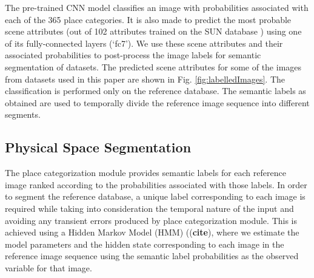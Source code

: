 \documentclass[letterpaper, 10 pt, conference]{ieeeconf}  %
\begin{document}
The pre-trained CNN model classifies an image with probabilities associated with each of the 365 place categories. It is also made to predict the most probable scene attributes (out of 102 attributes trained on the SUN database \cite{Patterson2012SunAttributes}) using one of its fully-connected layers (`fc7'). We use these scene attributes and their associated probabilities to post-process the image labels for semantic segmentation of datasets. The predicted scene attributes for some of the images from datasets used in this paper are shown in Fig. \ref{fig:labelledImages}. The classification is performed only on the reference database. The semantic labels as obtained are used to temporally divide the reference image sequence into different segments.

\subsection{Physical Space Segmentation}
The place categorization module provides semantic labels for each reference image ranked according to the probabilities associated with those labels. In order to segment the reference database, a unique label corresponding to each image is required while taking into consideration the temporal nature of the input and avoiding any transient errors produced by place categorization module. This is achieved using a Hidden Markov Model (HMM) ((\textbf{cite}), where we estimate the model parameters and the hidden state corresponding to each image in the reference image sequence using the semantic label probabilities as the observed variable for that image.
\end{document}
